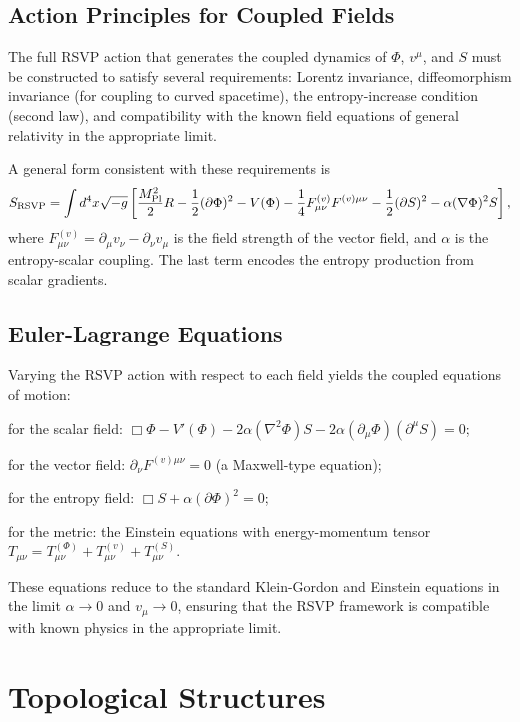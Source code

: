 \documentclass[12pt,a4paper,oneside]{book}
\theoremstyle{definition}
\theoremstyle{plain}
\theoremstyle{remark}
\begin{document}
\section{Action Principles for Coupled Fields}

The full RSVP action that generates the coupled dynamics of $\Phi$, $v^\mu$,
and $S$ must be constructed to satisfy several requirements: Lorentz invariance,
diffeomorphism invariance (for coupling to curved spacetime), the
entropy-increase condition (second law), and compatibility with the known
field equations of general relativity in the appropriate limit.

A general form consistent with these requirements is
\begin{equation}
S_{\rm RSVP} = \int d^4x\sqrt{-g}\left[
\frac{M_{\rm Pl}^2}{2}R
- \frac{1}{2}(\partial\Phi)^2
- V(\Phi)
- \frac{1}{4}F_{\mu\nu}^{(v)}F^{(v)\mu\nu}
- \frac{1}{2}(\partial S)^2
- \alpha(\nabla\Phi)^2 S
\right],
\end{equation}
where $F_{\mu\nu}^{(v)} = \partial_\mu v_\nu - \partial_\nu v_\mu$ is the
field strength of the vector field, and $\alpha$ is the entropy-scalar
coupling. The last term encodes the entropy production from scalar gradients.

\section{Euler-Lagrange Equations}

Varying the RSVP action with respect to each field yields the coupled equations
of motion:

for the scalar field: $\Box\Phi - V'(\Phi) - 2\alpha(\nabla^2\Phi)S - 2\alpha(\partial_\mu\Phi)(\partial^\mu S) = 0$;

for the vector field: $\partial_\nu F^{(v)\mu\nu} = 0$ (a Maxwell-type equation);

for the entropy field: $\Box S + \alpha(\partial\Phi)^2 = 0$;

for the metric: the Einstein equations with energy-momentum tensor
$T_{\mu\nu} = T_{\mu\nu}^{(\Phi)} + T_{\mu\nu}^{(v)} + T_{\mu\nu}^{(S)}$.

These equations reduce to the standard Klein-Gordon and Einstein equations
in the limit $\alpha \to 0$ and $v_\mu \to 0$, ensuring that the RSVP
framework is compatible with known physics in the appropriate limit.

\chapter{Topological Structures}
\end{document}
